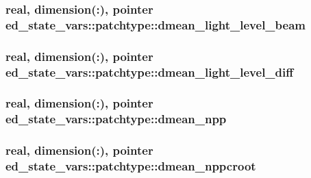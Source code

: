 \subsubsection[{\texorpdfstring{dmean\+\_\+light\+\_\+level\+\_\+beam}{dmean_light_level_beam}}]{\setlength{\rightskip}{0pt plus 5cm}real, dimension(\+:), pointer ed\+\_\+state\+\_\+vars\+::patchtype\+::dmean\+\_\+light\+\_\+level\+\_\+beam}\hypertarget{structed__state__vars_1_1patchtype_a7bf692865a30df5a0ff40d0a3891521d}{}\label{structed__state__vars_1_1patchtype_a7bf692865a30df5a0ff40d0a3891521d}
\subsubsection[{\texorpdfstring{dmean\+\_\+light\+\_\+level\+\_\+diff}{dmean_light_level_diff}}]{\setlength{\rightskip}{0pt plus 5cm}real, dimension(\+:), pointer ed\+\_\+state\+\_\+vars\+::patchtype\+::dmean\+\_\+light\+\_\+level\+\_\+diff}\hypertarget{structed__state__vars_1_1patchtype_a2e58f99f9175b80a01f12b06363e44d1}{}\label{structed__state__vars_1_1patchtype_a2e58f99f9175b80a01f12b06363e44d1}
\subsubsection[{\texorpdfstring{dmean\+\_\+npp}{dmean_npp}}]{\setlength{\rightskip}{0pt plus 5cm}real, dimension(\+:), pointer ed\+\_\+state\+\_\+vars\+::patchtype\+::dmean\+\_\+npp}\hypertarget{structed__state__vars_1_1patchtype_a6586748e08b04cbf3231780353f67678}{}\label{structed__state__vars_1_1patchtype_a6586748e08b04cbf3231780353f67678}
\subsubsection[{\texorpdfstring{dmean\+\_\+nppcroot}{dmean_nppcroot}}]{\setlength{\rightskip}{0pt plus 5cm}real, dimension(\+:), pointer ed\+\_\+state\+\_\+vars\+::patchtype\+::dmean\+\_\+nppcroot}\hypertarget{structed__state__vars_1_1patchtype_a28ea6c21667f2a827951ef0340c1968d}{}\label{structed__state__vars_1_1patchtype_a28ea6c21667f2a827951ef0340c1968d}
